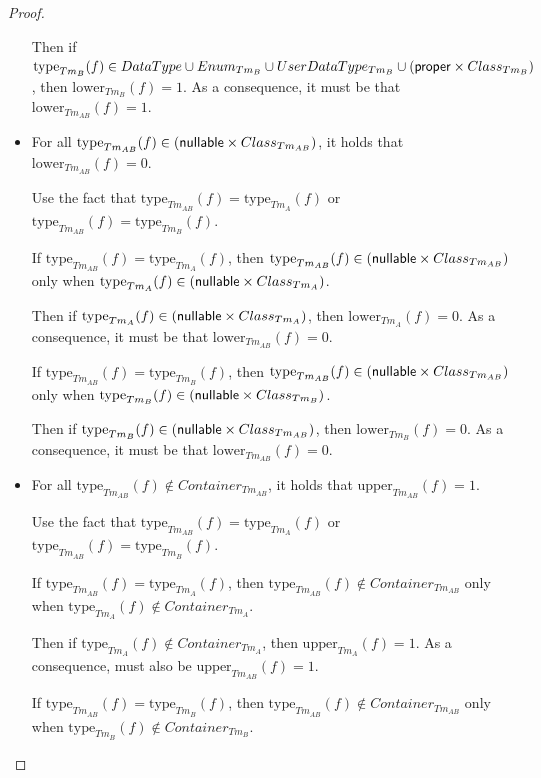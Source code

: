 \begin{proof}
\begin{itemize}
    Then if $\mathrm{type}_{Tm_{B}}(f) \in DataType \cup Enum_{Tm_{B}} \cup UserDataType_{Tm_{B}} \cup (\mathsf{proper} \times Class_{Tm_{B}})$, then $\mathrm{lower}_{Tm_{B}}(f) = 1$. As a consequence, it must be that $\mathrm{lower}_{Tm_{AB}}(f) = 1$.
    
    
    \item For all $\mathrm{type}_{Tm_{AB}}(f) \in (\mathsf{nullable} \times Class_{Tm_{AB}})$, it holds that $\mathrm{lower}_{Tm_{AB}}(f) = 0$.
    
    Use the fact that $\mathrm{type}_{Tm_{AB}}(f) = \mathrm{type}_{Tm_{A}}(f)$ or $\mathrm{type}_{Tm_{AB}}(f) = \mathrm{type}_{Tm_{B}}(f)$.
    
    If $\mathrm{type}_{Tm_{AB}}(f) = \mathrm{type}_{Tm_{A}}(f)$, then $\mathrm{type}_{Tm_{AB}}(f) \in (\mathsf{nullable} \times Class_{Tm_{AB}})$ only when $\mathrm{type}_{Tm_{A}}(f) \in (\mathsf{nullable} \times Class_{Tm_{A}})$.
    
    Then if $\mathrm{type}_{Tm_{A}}(f) \in (\mathsf{nullable} \times Class_{Tm_{A}})$, then $\mathrm{lower}_{Tm_{A}}(f) = 0$. As a consequence, it must be that $\mathrm{lower}_{Tm_{AB}}(f) = 0$.
    
    If $\mathrm{type}_{Tm_{AB}}(f) = \mathrm{type}_{Tm_{B}}(f)$, then $\mathrm{type}_{Tm_{AB}}(f) \in (\mathsf{nullable} \times Class_{Tm_{AB}})$ only when $\mathrm{type}_{Tm_{B}}(f) \in (\mathsf{nullable} \times Class_{Tm_{B}})$.
    
    Then if $\mathrm{type}_{Tm_{B}}(f) \in (\mathsf{nullable} \times Class_{Tm_{AB}})$, then $\mathrm{lower}_{Tm_{B}}(f) = 0$. As a consequence, it must be that $\mathrm{lower}_{Tm_{AB}}(f) = 0$.
    
    
    \item For all $\mathrm{type}_{Tm_{AB}}(f) \not\in Container_{Tm_{AB}}$, it holds that $\mathrm{upper}_{Tm_{AB}}(f) = 1$.
    
    Use the fact that $\mathrm{type}_{Tm_{AB}}(f) = \mathrm{type}_{Tm_{A}}(f)$ or $\mathrm{type}_{Tm_{AB}}(f) = \mathrm{type}_{Tm_{B}}(f)$.
    
    If $\mathrm{type}_{Tm_{AB}}(f) = \mathrm{type}_{Tm_{A}}(f)$, then $\mathrm{type}_{Tm_{AB}}(f) \not\in Container_{Tm_{AB}}$ only when $\mathrm{type}_{Tm_{A}}(f) \not\in Container_{Tm_{A}}$.
    
    Then if $\mathrm{type}_{Tm_{A}}(f) \not\in Container_{Tm_{A}}$, then $\mathrm{upper}_{Tm_{A}}(f) = 1$. As a consequence, must also be $\mathrm{upper}_{Tm_{AB}}(f) = 1$.
    
    If $\mathrm{type}_{Tm_{AB}}(f) = \mathrm{type}_{Tm_{B}}(f)$, then $\mathrm{type}_{Tm_{AB}}(f) \not\in Container_{Tm_{AB}}$ only when $\mathrm{type}_{Tm_{B}}(f) \not\in Container_{Tm_{B}}$.
    

\end{itemize}
\end{proof}
